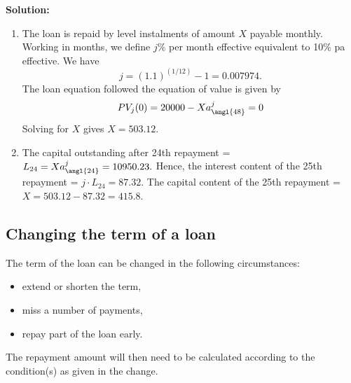 \documentclass[
]{book}
\theoremstyle{definition}
\theoremstyle{definition}
\theoremstyle{definition}
\theoremstyle{definition}
\theoremstyle{remark}
\begin{document}
\textbf{Solution:}

\begin{enumerate}
\def\labelenumi{\arabic{enumi}.}
\item
  The loan is repaid by level instalments of amount \(X\) payable
  monthly. Working in months, we define \(j\%\) per month effective
  equivalent to 10\% pa effective. We have
  \[j = (1.1)^{(1/12)} - 1 = 0.007974.\] The loan equation followed
  the equation of value is given by
  \[PV_j(0) = 20000 - X a^j_{\angl{48}} = 0\] Solving for \(X\) gives
  \(X =503.12\).
\item
  The capital outstanding after 24th repayment =
  \(L_{24} = X a^j_{\angl{24}} = 10950.23.\) Hence, the interest content
  of the 25th repayment = \(j \cdot L_{24} =87.32.\) The capital content
  of the 25th repayment = \(X =503.12 - 87.32 = 415.8.\)
\end{enumerate}

\hypertarget{changing-the-term-of-a-loan}{%
\subsection{Changing the term of a loan}\label{changing-the-term-of-a-loan}}

The term of the loan can be changed in the following circumstances:

\begin{itemize}
\item
  extend or shorten the term,
\item
  miss a number of payments,
\item
  repay part of the loan early.
\end{itemize}

The repayment amount will then need to be calculated according to the
condition(s) as given in the change.
\end{document}

